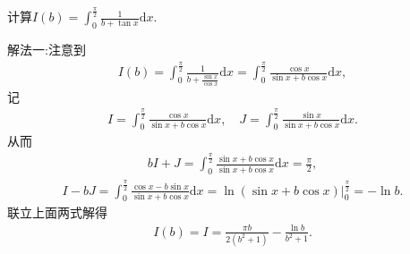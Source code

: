 \documentclass[../../main.tex]{subfiles}%
\begin{document}
\begin{example}
计算$I\left( b \right) =\int_0^{\frac{\pi}{2}}{\frac{1}{b+\tan x}\mathrm{d}x}.$
\end{example}
\begin{solution}

{\color{blue} 解法一:}注意到
\begin{align*}
I\left( b \right) =\int_0^{\frac{\pi}{2}}{\frac{1}{b+\frac{\sin x}{\cos x}}\mathrm{d}x}=\int_0^{\frac{\pi}{2}}{\frac{\cos x}{\sin x+b\cos x}\mathrm{d}x},
\end{align*}
记
\begin{align*}
I=\int_0^{\frac{\pi}{2}}{\frac{\cos x}{\sin x+b\cos x}\mathrm{d}x},\quad J=\int_0^{\frac{\pi}{2}}{\frac{\sin x}{\sin x+b\cos x}\mathrm{d}x}.
\end{align*}
从而
\begin{align*}
bI+J=\int_0^{\frac{\pi}{2}}{\frac{\sin x+b\cos x}{\sin x+b\cos x}\mathrm{d}x}=\frac{\pi}{2},
\end{align*}
\begin{align*}
I-bJ=\int_0^{\frac{\pi}{2}}{\frac{\cos x-b\sin x}{\sin x+b\cos x}\mathrm{d}x}=\ln \left( \sin x+b\cos x \right) \big| _{0}^{\frac{\pi}{2}}=-\ln b.
\end{align*}
联立上面两式解得
\begin{align*}
I\left( b \right) =I=\frac{\pi b}{2\left( b^2+1 \right)}-\frac{\ln b}{b^2+1}.
\end{align*}


\end{solution}
\end{document}
